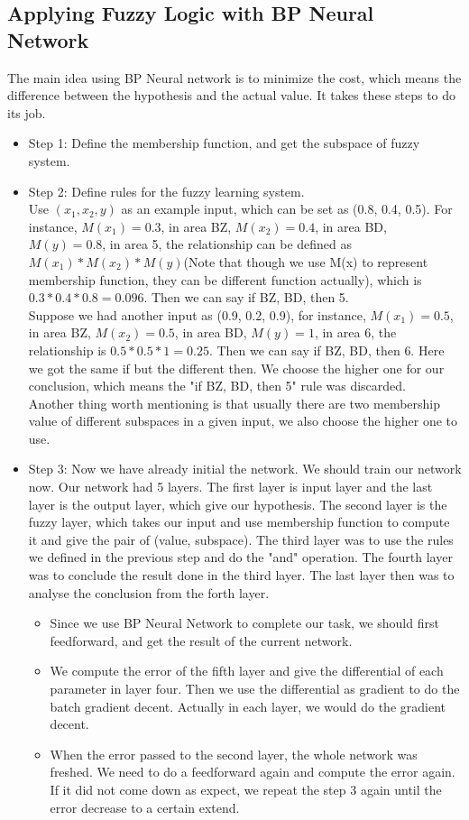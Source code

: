 \documentclass[12pt]{article} %
\begin{document}
\subsection{Applying Fuzzy Logic with BP Neural Network}
The main idea using BP Neural network is to minimize the cost, which means the difference between the hypothesis and the actual value. It takes these steps to do its job. 
\begin{itemize}
\item Step 1: Define the membership function, and get the subspace of fuzzy system.
\item Step 2: Define rules for the fuzzy learning system. \\
    Use $(x_1, x_2, y)$ as an example input, which can be set as (0.8, 0.4, 0.5). For instance, $M(x_1) = 0.3$, in area BZ, $M(x_2) = 0.4$, in area BD, $M(y) = 0.8$, in area 5, the relationship can be defined as $M(x_1) * M(x_2) * M(y)$(Note that though we use M(x) to represent membership function, they can be different function actually), which is $0.3 * 0.4 * 0.8 = 0.096$. Then we can say if BZ, BD, then 5. \\
    Suppose we had another input as (0.9, 0.2, 0.9), for instance, $M(x_1) = 0.5$, in area BZ, $M(x_2) = 0.5$, in area BD, $M(y) = 1$, in area 6, the relationship is $0.5 * 0.5 * 1 = 0.25$. Then we can say if BZ, BD, then 6. Here we got the same if but the different then. We choose the higher one for our conclusion, which means the "if BZ, BD, then 5" rule was discarded. \\
    Another thing worth mentioning is that usually there are two membership value of different subspaces in a given input, we also choose the higher one to use.
\item Step 3: Now we have already initial the network. We should train our network now. Our network had 5 layers. The first layer is input layer and the last layer is the output layer, which give our hypothesis. The second layer is the fuzzy layer, which takes our input and use membership function to compute it and give the pair of (value, subspace). The third layer was to use the rules we defined in the previous step and do the "and" operation. The fourth layer was to conclude the result done in the third layer. The last layer then was to analyse the conclusion from the forth layer.
    \begin{itemize}
        \item Since we use BP Neural Network to complete our task, we should first feedforward, and get the result of the current network.
        \item We compute the error of the fifth layer and give the differential of each parameter in layer four. Then we use the differential as gradient to do the batch gradient decent. Actually in each layer, we would do the gradient decent.
        \item When the error passed to the second layer, the whole network was freshed. We need to do a feedforward again and compute the error again. If it did not come down as expect, we repeat the step 3 again until the error decrease to a certain extend. 
    \end{itemize}
\end{itemize}
\end{document}
